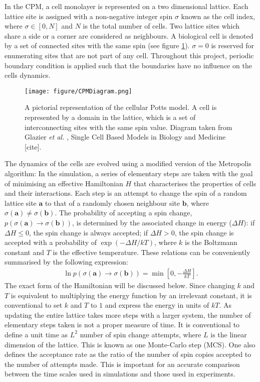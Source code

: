 \documentclass[a4paper,12pt]{article}
\newcommand{\inc}{\Delta}
\newcommand{\etal}{\emph{et al. }}
\begin{document}
In the CPM, a cell monolayer is represented on a two dimensional lattice. Each lattice site is assigned with a non-negative integer spin $\sigma$ known as the cell index, where $\sigma \in [0,N]$ and $N$ is the total number of cells. Two lattice sites which share a side or a corner are considered as neighbours. A biological cell is denoted by a set of connected sites with the same spin (see figure \ref{fig:CPM}). $\sigma = 0$ is reserved for enumerating sites that are not part of any cell. Throughout this project, periodic boundary condition is applied such that the boundaries have no influence on the cells dynamics.

\begin{figure}[h]
\centering
\texttt{[image: figure/CPMDiagram.png]}
\caption{A pictorial representation of the cellular Potts model. A cell is represented by a domain in the lattice, which is a set of interconnecting sites with the same spin value. Diagram taken from Glazier \etal, Single Cell Based Models in Biology and Medicine [cite].}
\label{fig:CPM}
\end{figure}

The dynamics of the cells are evolved using a modified version of the Metropolis algorithm: In the simulation, a series of elementary steps are taken with the goal of minimising an effective Hamiltonian $H$ that characterises the properties of cells and their interactions. Each step is an attempt to change the spin of a random lattice site $\bm{a}$ to that of a randomly chosen neighbour site $\bm{b}$, where $\sigma(\bm{a}) \neq \sigma(\bm{b})$. The probability of accepting a spin change, $p\left(\sigma(\bm{a}) \rightarrow \sigma(\bm{b})\right)$, is determined by the associated change in energy ($\inc H$): if $\inc H \leq 0$, the spin change is always accepted; if $\inc H > 0$, the spin change is accepted with a probability of $\exp(-\inc H / kT)$, where $k$ is the Boltzmann constant and $T$ is the effective temperature. These relations can be conveniently summarised by the following expression:
\begin{eqnarray}
\ln p\left(\sigma(\bm{a}) \rightarrow \sigma(\bm{b})\right) = \min\left[0,-\frac{\inc H}{kT}\right].
\end{eqnarray}
The exact form of the Hamiltonian will be discussed below. Since changing $k$ and $T$ is equivalent to multiplying the energy function by an irrelevant constant, it is conventional to set $k$ and $T$ to $1$ and express the energy in units of $kT$. As updating the entire lattice takes more steps with a larger system, the number of elementary steps taken is not a proper measure of time. It is conventional to define a unit time as $L^2$ number of spin change attempts, where $L$ is the linear dimension of the lattice. This is known as one Monte-Carlo step (MCS). One also defines the acceptance rate as the ratio of the number of spin copies accepted to the number of attempts made. This is important for an accurate comparison between the time scales used in simulations and those used in experiments\cite{sanz2010}.
\end{document}
